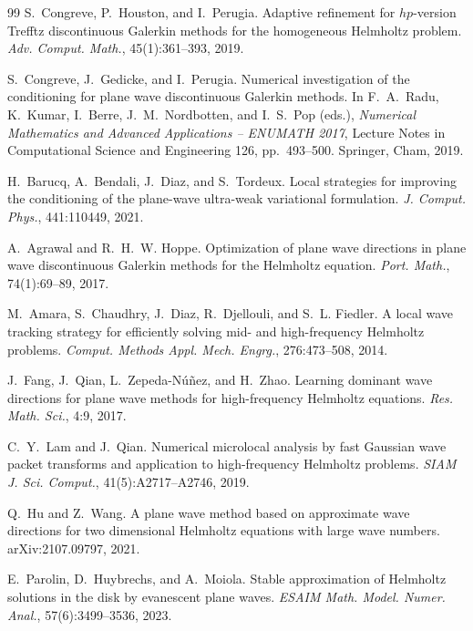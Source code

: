 \documentclass[pdflatex,sn-mathphys-num]{sn-jnl}
\theoremstyle{thmstyleone}
\theoremstyle{thmstyletwo}
\begin{document}
\begin{thebibliography}{99}
S.~Congreve, P.~Houston, and I.~Perugia.
\newblock Adaptive refinement for $hp$-version Trefftz discontinuous Galerkin methods for the homogeneous Helmholtz problem.
\newblock \emph{Adv. Comput. Math.}, 45(1):361--393, 2019.

S.~Congreve, J.~Gedicke, and I.~Perugia.
\newblock Numerical investigation of the conditioning for plane wave discontinuous Galerkin methods.
\newblock In F.~A.~Radu, K.~Kumar, I.~Berre, J.~M.~Nordbotten, and I.~S.~Pop (eds.), \emph{Numerical Mathematics and Advanced Applications -- ENUMATH 2017}, Lecture Notes in Computational Science and Engineering 126, pp.~493--500. Springer, Cham, 2019.

H.~Barucq, A.~Bendali, J.~Diaz, and S.~Tordeux.
\newblock Local strategies for improving the conditioning of the plane-wave ultra-weak variational formulation.
\newblock \emph{J. Comput. Phys.}, 441:110449, 2021.

A.~Agrawal and R.~H.~W. Hoppe.
\newblock Optimization of plane wave directions in plane wave discontinuous Galerkin methods for the Helmholtz equation.
\newblock \emph{Port. Math.}, 74(1):69--89, 2017.

M.~Amara, S.~Chaudhry, J.~Diaz, R.~Djellouli, and S.~L. Fiedler.
\newblock A local wave tracking strategy for efficiently solving mid- and high-frequency Helmholtz problems.
\newblock \emph{Comput. Methods Appl. Mech. Engrg.}, 276:473--508, 2014.

J.~Fang, J.~Qian, L.~Zepeda-N\'u\~nez, and H.~Zhao.
\newblock Learning dominant wave directions for plane wave methods for high-frequency Helmholtz equations.
\newblock \emph{Res. Math. Sci.}, 4:9, 2017.

C.~Y.~Lam and J.~Qian.
\newblock Numerical microlocal analysis by fast Gaussian wave packet transforms and application to high-frequency Helmholtz problems.
\newblock \emph{SIAM J. Sci. Comput.}, 41(5):A2717--A2746, 2019.

Q.~Hu and Z.~Wang.
\newblock A plane wave method based on approximate wave directions for two dimensional Helmholtz equations with large wave numbers.
\newblock arXiv:2107.09797, 2021.

E.~Parolin, D.~Huybrechs, and A.~Moiola.
\newblock Stable approximation of Helmholtz solutions in the disk by evanescent plane waves.
\newblock \emph{ESAIM Math. Model. Numer. Anal.}, 57(6):3499--3536, 2023.


\end{thebibliography}
\end{document}
